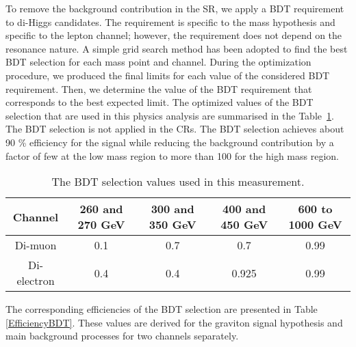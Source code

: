 \begin{small}
To remove the background contribution in the SR, we apply a BDT requirement to di-Higgs candidates.  The requirement is specific to the mass hypothesis and specific to the lepton channel; however, the requirement does not depend on the resonance nature. A simple grid search method has been adopted to find the best BDT selection for each mass point and channel. During the optimization procedure, we produced the final limits for each value of the considered BDT requirement. Then, we determine the value of the BDT requirement that corresponds to the best expected limit. The optimized values of the BDT selection that are used in this physics analysis are summarised in the Table~\ref{suboptCut}. The BDT selection is not applied in the CRs. The BDT selection achieves about 90 \% efficiency for the signal while reducing the background contribution by a factor of few at the low mass region to more than 100 for the high mass region.

\begin{table}
\begin{center} 
  \caption{The BDT selection values used in this measurement.}
 \begin{tabular}{ |c|c|c|c|c| } \hline%
   Channel & 260 and 270 GeV & 300 and 350 GeV & 400 and 450 GeV & 600 to 1000 GeV \\ \hline
   Di-muon & 0.1 & 0.7 & 0.7 & 0.99 \\ %
   Di-electron & 0.4 & 0.4 & 0.925 & 0.99\\ \hline%
  \end{tabular}
  \label{suboptCut}
\end{center}   
\end{table}

The corresponding efficiencies of the BDT selection are presented in Table \ref{EfficiencyBDT}. These values are derived for the graviton signal hypothesis and main background processes for two channels separately. 


\end{small}
